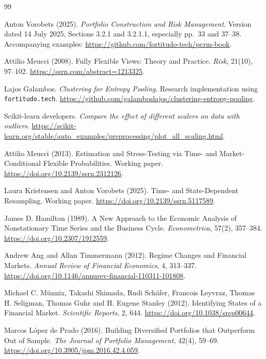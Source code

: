 \documentclass[11pt,a4paper]{article}
\begin{document}
\begin{thebibliography}{99}

Anton Vorobets (2025).
\emph{Portfolio Construction and Risk Management}.
Version dated 14 July 2025, Sections 3.2.1 and 3.2.1.1, especially pp.~33 and 37--38.
Accompanying examples:
\url{https://github.com/fortitudo-tech/pcrm-book}.

Attilio Meucci (2008).
Fully Flexible Views: Theory and Practice.
\emph{Risk}, 21(10), 97--102.
\url{https://ssrn.com/abstract=1213325}.

Lajos Galambos.
\emph{Clustering for Entropy Pooling}.
Research implementation using \texttt{fortitudo.tech}.
\url{https://github.com/galamboslajos/clustering-entropy-pooling}.

Scikit-learn developers.
\emph{Compare the effect of different scalers on data with outliers}.
\url{https://scikit-learn.org/stable/auto_examples/preprocessing/plot_all_scaling.html}.


Attilio Meucci (2013).
Estimation and Stress-Testing via Time- and Market-Conditional Flexible Probabilities.
Working paper.
\url{https://doi.org/10.2139/ssrn.2312126}.

Laura Kristensen and Anton Vorobets (2025).
Time- and State-Dependent Resampling.
Working paper.
\url{https://doi.org/10.2139/ssrn.5117589}.

James D. Hamilton (1989).
A New Approach to the Economic Analysis of Nonstationary Time Series and the Business Cycle.
\emph{Econometrica}, 57(2), 357--384.
\url{https://doi.org/10.2307/1912559}.

Andrew Ang and Allan Timmermann (2012).
Regime Changes and Financial Markets.
\emph{Annual Review of Financial Economics}, 4, 313--337.
\url{https://doi.org/10.1146/annurev-financial-110311-101808}.

Michael C. M\"unnix, Takashi Shimada, Rudi Sch\"afer, Francois Leyvraz,
Thomas H. Seligman, Thomas Guhr and H. Eugene Stanley (2012).
Identifying States of a Financial Market.
\emph{Scientific Reports}, 2, 644.
\url{https://doi.org/10.1038/srep00644}.

Marcos L\'opez de Prado (2016).
Building Diversified Portfolios that Outperform Out of Sample.
\emph{The Journal of Portfolio Management}, 42(4), 59--69.
\url{https://doi.org/10.3905/jpm.2016.42.4.059}.


\end{thebibliography}
\end{document}
